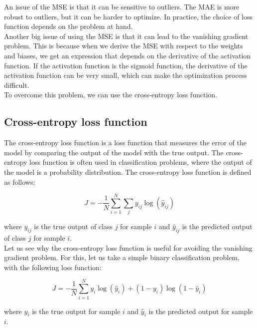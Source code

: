 An issue of the MSE is that it can be sensitive to outliers. The MAE is more
robust to outliers, but it can be harder to optimize. In practice, the choice of
loss function depends on the problem at hand.\\

Another big issue of using the MSE is that it can lead to the vanishing gradient
problem. This is because when we derive the MSE with respect to the weights and
biases, we get an expression that depends on the derivative of the activation
function. If the activation function is the sigmoid function, the derivative
of the activation function can be very small, which can make the optimization
process difficult.\\

To overcome this problem, we can use the cross-entropy loss function.

\subsection{Cross-entropy loss function}

The cross-entropy loss function is a loss function that measures the error of the
model by comparing the output of the model with the true output. The cross-entropy
loss function is often used in classification problems, where the output of the
model is a probability distribution. The cross-entropy loss function is defined as
follows:

\begin{equation}
    J = -\frac{1}{N} \sum_{i=1}^{N} \sum_{j} y_{ij} \log(\hat{y}_{ij})
\end{equation}

where $y_{ij}$ is the true output of class $j$ for sample $i$ and $\hat{y}_{ij}$
is the predicted output of class $j$ for sample $i$.\\ 

Let us see why the cross-entropy loss function is useful for avoiding the vanishing
gradient problem. For this, let us take a simple binary classification problem,
with the following loss function:

\begin{equation}
    J = -\frac{1}{N} \sum_{i=1}^{N} y_i \log(\hat{y}_i) + (1 - y_i) \log(1 - \hat{y}_i)
\end{equation}

where $y_i$ is the true output for sample $i$ and $\hat{y}_i$ is the predicted
output for sample $i$.\\

